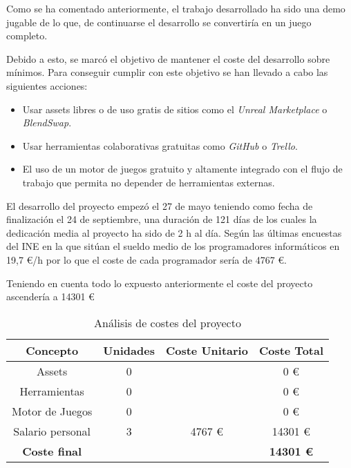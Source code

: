 Como se ha comentado anteriormente, el trabajo desarrollado ha sido una demo jugable de lo que, de continuarse el desarrollo se convertiría en un juego completo.

Debido a esto, se marcó el objetivo de mantener el coste del desarrollo sobre mínimos. Para conseguir cumplir con este objetivo se han llevado a cabo las siguientes acciones:
\begin{itemize}
	\item Usar assets libres o de uso gratis de sitios como el \textit{Unreal Marketplace} o \textit{BlendSwap}.
	\item Usar herramientas colaborativas gratuitas como \textit{GitHub} o \textit{Trello}.
	\item El uso de un motor de juegos gratuito y altamente integrado con el flujo de trabajo que permita no depender de herramientas externas.
\end{itemize}

El desarrollo del proyecto empezó el 27 de mayo teniendo como fecha de finalización el 24 de septiembre, una duración de 121 días de los cuales la dedicación media al proyecto ha sido de 2 h al día. 
Según las últimas encuestas del INE \cite{15} en la que sitúan el sueldo medio de los programadores informáticos en 19,7 \euro/h por lo que el coste de cada programador sería de 4767 \euro.

Teniendo en cuenta todo lo expuesto anteriormente el coste del proyecto ascendería a 14301 \euro \\

\begin{table}[!h]
\centering
\begin{tabular}{cccc}
\hline
\textbf{Concepto} & \textbf{Unidades} & \textbf{Coste Unitario} & \textbf{Coste Total} \\ \hline
Assets            & 0                 &                         & 0 \euro                  \\ \hline
Herramientas      & 0                 &                         & 0 \euro                  \\ \hline
Motor de Juegos   & 0                 &                         & 0 \euro                  \\ \hline
Salario personal  & 3                 & 4767 \euro                    & 14301 \euro               \\ \hline
\textbf{Coste final}       &                   &                         & \textbf{14301 \euro}               \\ \hline
\end{tabular}
\caption{Análisis de costes del proyecto}
\end{table}